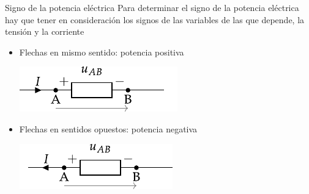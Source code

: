\documentclass[aspectratio=169, xcolor={usenames,svgnames,dvipsnames}]{beamer}
\begin{document}
\begin{frame}{Signo de la potencia eléctrica}
    Para determinar el \alert{signo de la potencia eléctrica} hay que tener en consideración los signos de las variables de las que depende, la tensión y la corriente
    \vspace{5mm}
    \begin{itemize}
        \item Flechas en \alert{mismo sentido}: potencia \alert{positiva} %

        \vspace{2mm}        
        \begin{center}
            \includegraphics[height=0.17\textheight]{../figs/signo_potencia1.pdf}            
        \end{center}
    
    \vspace{5mm}
        \item Flechas en \alert{sentidos opuestos}: potencia \alert{negativa} %

        \vspace{2mm}  
        \begin{center}
            \hspace*{-7mm}
            \includegraphics[height=0.17\textheight]{../figs/signo_potencia2.pdf}
        \end{center}
    \end{itemize}
\end{frame}
\end{document}
